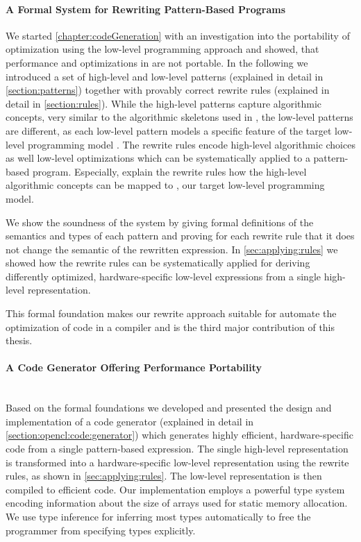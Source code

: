 \paragraph{A Formal System for Rewriting Pattern-Based Programs}
We started \autoref{chapter:codeGeneration} with an investigation into the portability of optimization using the low-level programming approach \OpenCL and showed, that performance and optimizations in \OpenCL are not portable.
In the following we introduced a set of high-level and low-level patterns (explained in detail in \autoref{section:patterns}) together with provably correct rewrite rules (explained in detail in \autoref{section:rules}).
While the high-level patterns capture algorithmic concepts, very similar to the algorithmic skeletons used in \SkelCL, the low-level patterns are different, as each low-level pattern models a specific feature of the target low-level programming model \OpenCL.
The rewrite rules encode high-level algorithmic choices as well low-level optimizations which can be systematically applied to a pattern-based program.
Especially, explain the rewrite rules how the high-level algorithmic concepts can be mapped to \OpenCL, our target low-level programming model.

We show the soundness of the system by giving formal definitions of the semantics and types of each pattern and proving for each rewrite rule that it does not change the semantic of the rewritten expression.
In \autoref{sec:applying:rules} we showed how the rewrite rules can be systematically applied for deriving differently optimized, hardware-specific low-level expressions from a single high-level representation.

\bigskip
This formal foundation makes our rewrite approach suitable for automate the optimization of code in a compiler and is the third major contribution of this thesis.

\paragraph{A Code Generator Offering Performance Portability}\hfill\\
Based on the formal foundations we developed and presented the design and implementation of a code generator (explained in detail in \autoref{section:opencl:code:generator}) which generates highly efficient, hardware-specific \OpenCL code from a single pattern-based expression.
The single high-level representation is transformed into a hardware-specific low-level representation using the rewrite rules, as shown in \autoref{sec:applying:rules}.
The low-level representation is then compiled to efficient \OpenCL code.
Our implementation employs a powerful type system encoding information about the size of arrays used for static memory allocation.
We use type inference for inferring most types automatically to free the programmer from specifying types explicitly.

